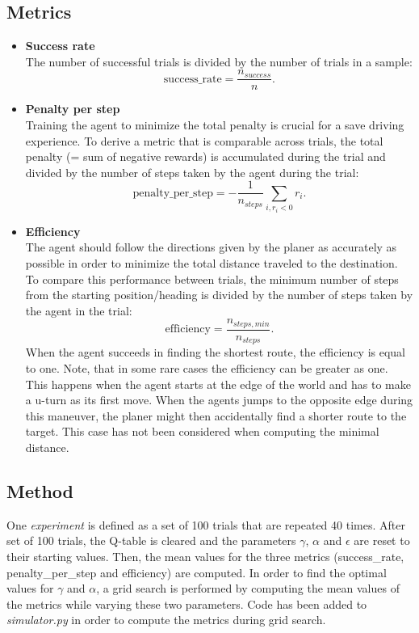 \documentclass[11pt]{article}
\begin{document}
\subsection{Metrics}
\begin{itemize}

\item \textbf{Success rate}\\
The number of successful trials is divided by the number of trials in a sample:
$$ \mathrm{success\_rate} = \frac{n_{success}}{n}. $$

\item \textbf{Penalty per step}\\
Training the agent to minimize the total penalty is crucial for a save driving experience. To derive a metric that is comparable 
across trials, the total penalty (= sum of negative rewards) is accumulated during the trial and divided by the number of steps taken 
by the agent during the trial:
$$ \mathrm{penalty\_per\_step} = - \frac{1}{n_{steps}}\sum\limits_{i, r_i < 0} r_i.$$

\item \textbf{Efficiency}\\
The agent should follow the directions given by the planer as accurately as possible in order to minimize the total distance traveled to the destination. To compare this performance between trials, the minimum number of steps from the starting position/heading is divided by the number of steps taken by the agent in the trial:
$$ \mathrm{efficiency} = \frac{n_{steps,min}}{n_{steps}}.$$
When the agent succeeds in finding the shortest route, the efficiency is equal to one. Note, that in some rare cases the efficiency can be greater as one. This happens when the agent starts at the edge of the world and has to make a u-turn as its first move. When the agents jumps to the opposite edge during this maneuver, the planer might then accidentally find a shorter route to the target. This case has not been considered when computing the minimal distance.
\end{itemize}

\subsection{Method}
One \textit{experiment} is defined as a set of 100 trials that are repeated 40 times. After set of 100 trials, the Q-table is cleared and the parameters $\gamma$, $\alpha$ and $\epsilon$ are reset to their starting values. Then, the mean values for the three metrics (success\_rate, penalty\_per\_step and efficiency) are computed.
In order to find the optimal values for $\gamma$ and $\alpha$, a grid search is performed by computing the mean values of the metrics while varying these two parameters. Code has been added to \textit{simulator.py} in order to compute the metrics during grid search.
\end{document}
